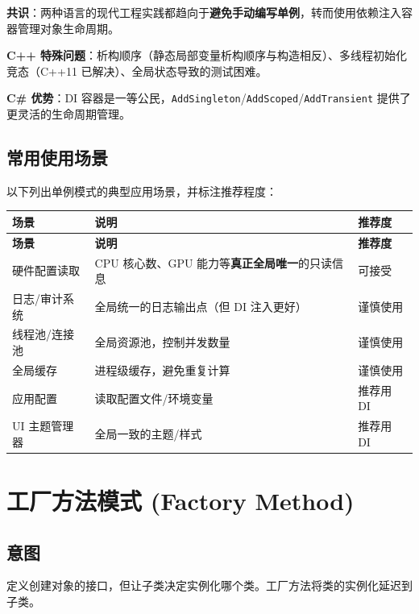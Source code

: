\documentclass[12pt,a4paper,fontset=fandol]{ctexbook}
\begin{document}
\begin{compare}
\textbf{共识}：两种语言的现代工程实践都趋向于\textbf{避免手动编写单例}，转而使用依赖注入容器管理对象生命周期。

\textbf{C++ 特殊问题}：析构顺序（静态局部变量析构顺序与构造相反）、多线程初始化竞态（C++11 已解决）、全局状态导致的测试困难。

\textbf{C\# 优势}：DI 容器是一等公民，\texttt{AddSingleton}/\allowbreak{}\texttt{AddScoped}/\allowbreak{}\texttt{AddTransient} 提供了更灵活的生命周期管理。
\end{compare}

\section{常用使用场景}

以下列出单例模式的典型应用场景，并标注推荐程度：

\begin{longtable}{p{4cm} p{6cm} p{3cm}}
\toprule
\textbf{场景} & \textbf{说明} & \textbf{推荐度} \\
\midrule
\endfirsthead
\toprule
\textbf{场景} & \textbf{说明} & \textbf{推荐度} \\
\midrule
\endhead
\bottomrule
\endfoot
硬件配置读取 & CPU 核心数、GPU 能力等\textbf{真正全局唯一}的只读信息 & 可接受 \\
日志/审计系统 & 全局统一的日志输出点（但 DI 注入更好） & 谨慎使用 \\
线程池/连接池 & 全局资源池，控制并发数量 & 谨慎使用 \\
全局缓存 & 进程级缓存，避免重复计算 & 谨慎使用 \\
应用配置 & 读取配置文件/环境变量 & 推荐用 DI \\
UI 主题管理器 & 全局一致的主题/样式 & 推荐用 DI \\
\end{longtable}

\chapter{工厂方法模式 (Factory Method)}

\section{意图}

定义创建对象的接口，但让子类决定实例化哪个类。工厂方法将类的实例化延迟到子类。
\end{document}
